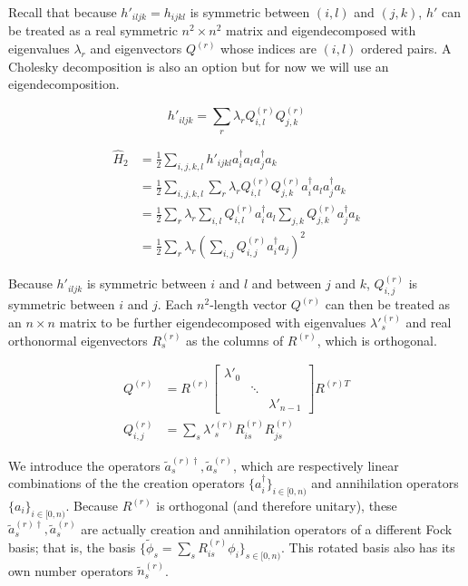Recall that because $h'_{iljk} = h_{ijkl}$ is symmetric between $(i, l)$ and $(j, k)$, $h'$ can be treated as a real symmetric $n^2 \times n^2$ matrix and eigendecomposed with eigenvalues $\lambda_r$ and eigenvectors $Q^{(r)}$ whose indices are $(i, l)$ ordered pairs. A Cholesky decomposition is also an option but for now we will use an eigendecomposition.

\begin{equation}
    h'_{iljk} = \sum_r \lambda_r Q^{(r)}_{i, l}Q^{(r)}_{j, k}
\end{equation}

\begin{equation}
    \begin{split}
        \hat{H}_2 &= \frac{1}{2}\sum_{i,j,k,l} h'_{ijkl}a^\dag_ia_la^\dag_ja_k \\
        &= \frac{1}{2}\sum_{i,j,k,l} \sum_r \lambda_r Q^{(r)}_{i, l}Q^{(r)}_{j, k}a^\dag_ia_la^\dag_ja_k \\
        &= \frac{1}{2}\sum_r \lambda_r \sum_{i,l} Q^{(r)}_{i, l}a^\dag_ia_l\sum_{j,k}Q^{(r)}_{j, k}a^\dag_ja_k \\
        &= \frac{1}{2}\sum_r\lambda_r(\sum_{i,j} Q^{(r)}_{i, j}a^\dag_ia_j)^2
    \end{split}
\end{equation}

Because $h'_{iljk}$ is symmetric between $i$ and $l$ and between $j$ and $k$, $Q^{(r)}_{i, j}$ is symmetric between $i$ and $j$. Each $n^2$-length vector $Q^{(r)}$ can then be treated as an $n \times n$ matrix to be further eigendecomposed with eigenvalues $\lambda'^{(r)}_s$ and real orthonormal eigenvectors $R^{(r)}_s$ as the columns of $R^{(r)}$, which is orthogonal.

\begin{equation}
    \begin{split}
        Q^{(r)} &= R^{(r)}\begin{bmatrix}
            \lambda'_0 & & \\ & \ddots & \\ & & \lambda'_{n - 1}
          \end{bmatrix}R^{(r)T} \\
        Q^{(r)}_{i, j} &= \sum_s \lambda'^{(r)}_s R^{(r)}_{is}R^{(r)}_{js}
    \end{split}
\end{equation}

We introduce the operators $\tilde{a}^{(r)\dag}_s, \tilde{a}^{(r)}_s$, which are respectively linear combinations of the the creation operators $\{a^\dag_i\}_{i \in [0, n)}$ and annihilation operators $\{a_i\}_{i \in [0, n)}$. Because $R^{(r)}$ is orthogonal (and therefore unitary), these $\tilde{a}^{(r)\dag}_s, \tilde{a}^{(r)}_s$ are actually creation and annihilation operators of a different Fock basis; that is, the basis $\{\tilde{\phi}_s = \sum_s R^{(r)}_{is} \phi_i\}_{s \in [0, n)}$. This rotated basis also has its own number operators $\tilde{n}^{(r)}_s$.

